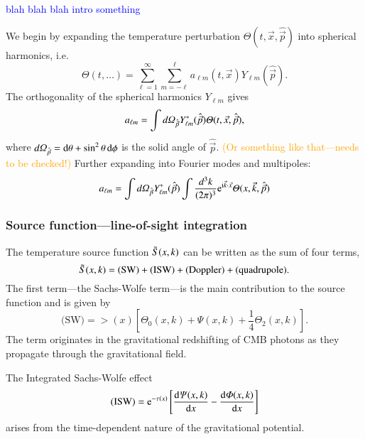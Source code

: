 \textcolor{blue}{blah blah blah intro something}


We begin by expanding the temperature perturbation $\Theta(t, \vec{x}, \hat{\vec{p}})$ into spherical harmonics,
i.e.
\begin{equation}
    \Theta(t, \dots) = \sum_{\ell=1}^{\infty} \sum_{m=-\ell}^{\ell} a_{\ell m}(t, \vec{x}) Y_{\ell m} (\hat{\vec{p}}).
\end{equation}
The orthogonality of the spherical harmonics $Y_{\ell m}$ gives
\begin{equation}
    a_{\ell m} = \int \dOmg[p] Y^*_{\ell m} (\hat{\vec{p}}) \Theta(t, \vec{x}, \hat{\vec{p}}),
\end{equation}
where $d\varOmega_{\hat{\vec{p}}} = \diff \theta + \sin^2{\theta}\diff \phi$ is the solid angle of $\hat{\vec{p}}$. \textcolor{orange}{(Or something like that---needs to be checked!)} Further expanding into Fourier modes and multipoles:
\begin{equation}
\begin{split}
    a_{\ell m} = \int \dOmg[p] Y^*_{\ell m} (\hat{\vec{p}}) \int \frac{d^3 k}{(2\pi)^3} \eu[\im \vec{k}\cdot \vec{x}] \Theta(x, \vec{k}, \hat{\vec{p}}) 
\end{split}
\end{equation}


\subsubsection{Source function---line-of-sight integration}
    The temperature source function $\St(x,k)$ can be written as the sum of four terms,
    \begin{equation}\label{mil4:theo:eq:source_function_four_terms}
        \St(x,k) = \text{(SW)} + \text{(ISW)} + \text{(Doppler)} + \text{(quadrupole)}.
    \end{equation}
    The first term---the Sachs-Wolfe term---is the main contribution to the source function and is given by
    \begin{equation}
        \text{(SW)} = \gt(x) \left[\Theta_0(x,k) + \Psi(x,k) + \frac{1}{4}\Theta_2(x,k) \right].
    \end{equation}
    The term originates in the gravitational redshifting of CMB photons as they propagate through the gravitational field.

    The Integrated Sachs-Wolfe effect %
    \begin{equation}
        \text{(ISW)} = \eu[-\tau(x)] \left[ \dv{\Psi(x,k)}{x}-  \dv{\Phi(x,k)}{x} \right]
    \end{equation}
    arises from the time-dependent nature of the gravitational potential.


